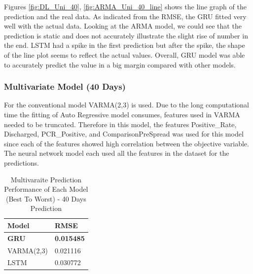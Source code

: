 Figures \ref{fig:DL_Uni_40}, \ref{fig:ARMA_Uni_40_line} shows the line graph of the prediction and the real data. As indicated from the RMSE, the GRU fitted very well with the actual data. Looking at the ARMA model, we could see that the prediction is static and does not accurately illustrate the slight rise of number in the end. LSTM had a spike in the first prediction but after the spike, the shape of the line plot seems to reflect the actual values. Overall, GRU model was able to accurately predict the value in a big margin compared with other models. 



\subsubsection{Multivariate Model (40 Days)}
For the conventional model VARMA(2,3) is used. Due to the long computational time the fitting of Auto Regressive model consumes, features used in VARMA needed to be truncated. Therefore in this model, the features Positive\_Rate, Discharged, PCR\_Positive, and ComparisonPreSpread was used for this model since each of the features showed high correlation between the objective variable. The neural network model each used all the features in the dataset for the predictions. 
\begin{table}[h]
\caption{Multivaraite Prediction Performance of Each Model (Best To Worst) - 40 Days Prediction}
    \label{tab:40Mult}
    \centering
    \begin{tabular}{ |p{3cm}||p{3cm}| }
        \hline
         Model &  RMSE\\
        \hline
        \textbf{GRU}  & \textbf{0.015485}\\
        VARMA(2,3) & 0.021116\\
        LSTM  & 0.030772\\
    \hline
    \end{tabular}
\end{table}

